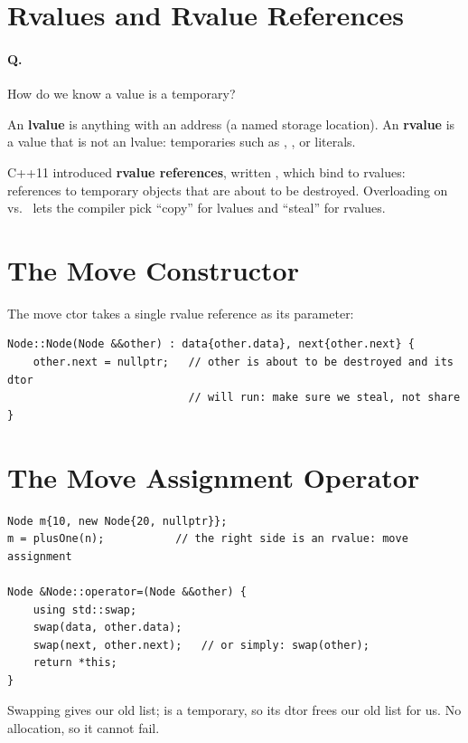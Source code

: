 \section{Rvalues and Rvalue References}
\paragraph{Q.} How do we know a value is a temporary?

\begin{definition}
An \textbf{lvalue} is anything with an address (a named storage location). An
\textbf{rvalue} is a value that is not an lvalue: temporaries such as
, , or literals.
\end{definition}

C++11 introduced \textbf{rvalue references}, written , which bind
to rvalues: references to temporary objects that are about to be destroyed.
Overloading on  vs.\  lets the compiler pick
``copy'' for lvalues and ``steal'' for rvalues.

\section{The Move Constructor}
The move ctor takes a single rvalue reference as its parameter:
\begin{lstlisting}[style=cpp]
Node::Node(Node &&other) : data{other.data}, next{other.next} {
    other.next = nullptr;   // other is about to be destroyed and its dtor
                            // will run: make sure we steal, not share
}
\end{lstlisting}

\begin{center}
\end{center}

\section{The Move Assignment Operator}
\begin{lstlisting}[style=cpp]
Node m{10, new Node{20, nullptr}};
m = plusOne(n);           // the right side is an rvalue: move assignment

Node &Node::operator=(Node &&other) {
    using std::swap;
    swap(data, other.data);
    swap(next, other.next);   // or simply: swap(other);
    return *this;
}
\end{lstlisting}
Swapping gives  our old list;  is a temporary, so its
dtor frees our old list for us. No allocation, so it cannot fail.

